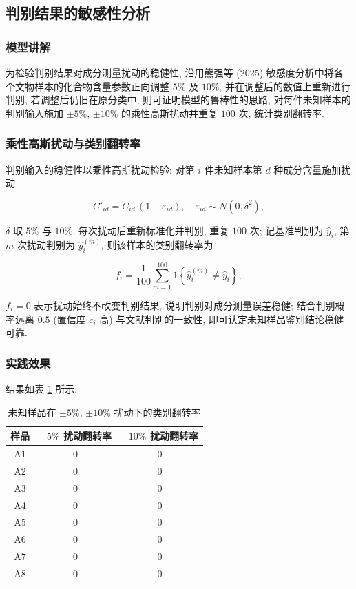 \documentclass{ctexart}
\begin{document}
\subsection{判别结果的敏感性分析}

\subsubsection{模型讲解}

为检验判别结果对成分测量扰动的稳健性, 沿用熊强等 (2025) 敏感度分析中将各个文物样本的化合物含量参数正向调整 $5\%$ 及 $10\%$, 并在调整后的数值上重新进行判别, 若调整后仍旧在原分类中, 则可证明模型的鲁棒性的思路, 对每件未知样本的判别输入施加 $\pm5\%$, $\pm10\%$ 的乘性高斯扰动并重复 $100$ 次, 统计类别翻转率.


\subsubsection{乘性高斯扰动与类别翻转率}

判别输入的稳健性以乘性高斯扰动检验: 对第 $i$ 件未知样本第 $d$ 种成分含量施加扰动

\begin{equation*}
C'_{id}=C_{id}\,\left(1+\varepsilon_{id}\right),\quad\varepsilon_{id}\sim{}N\left(0,\delta^{2}\right),
\end{equation*}

$\delta$ 取 $5\%$ 与 $10\%$, 每次扰动后重新标准化并判别, 重复 $100$ 次; 记基准判别为 $\widehat{y}_i$, 第 $m$ 次扰动判别为 $\widehat{y}_i^{\left(m\right)}$, 则该样本的类别翻转率为

\begin{equation*}
f_i=\frac{1}{100}\sum_{m=1}^{100}\mathrm{1}\left\{\widehat{y}_i^{\left(m\right)}\neq\widehat{y}_i\right\},
\end{equation*}

$f_i=0$ 表示扰动始终不改变判别结果, 说明判别对成分测量误差稳健; 结合判别概率远离 $0.5$ (置信度 $c_i$ 高) 与文献判别的一致性, 即可认定未知样品鉴别结论稳健可靠.

\subsubsection{实践效果}

结果如表 \ref{tab:flip} 所示.

\begin{table}[htbp]
\centering
\caption{未知样品在 $\pm5\%$, $\pm10\%$ 扰动下的类别翻转率}
\label{tab:flip}
\begin{tabular}{c|c|c}
\hline
样品 & $\pm5\%$ 扰动翻转率 & $\pm10\%$ 扰动翻转率 \\
\hline
A1 & $0$ & $0$ \\
A2 & $0$ & $0$ \\
A3 & $0$ & $0$ \\
A4 & $0$ & $0$ \\
A5 & $0$ & $0$ \\
A6 & $0$ & $0$ \\
A7 & $0$ & $0$ \\
A8 & $0$ & $0$ \\
\hline
\end{tabular}
\end{table}
\end{document}
